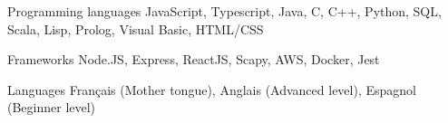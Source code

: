 
\begin{cvskills}
  \cvskill
    {Programming languages} %
    {JavaScript, Typescript, Java, C, C++, Python, SQL, Scala, Lisp, Prolog, Visual Basic, HTML/CSS} %

  \cvskill
    {Frameworks} %
    {Node.JS, Express, ReactJS, Scapy, AWS, Docker, Jest} %
    
  \cvskill
    {Languages} %
    {Français (Mother tongue), Anglais (Advanced level), Espagnol (Beginner level)} %
\end{cvskills}

